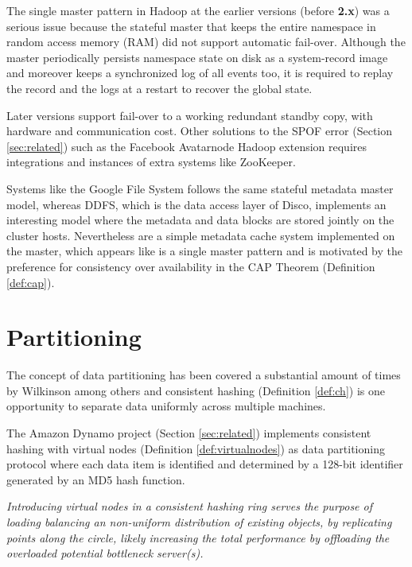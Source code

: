 The single master pattern in Hadoop at the earlier versions (before \textbf{2.x}) was a serious issue because the stateful master that keeps the entire namespace in random access memory (RAM) did not support automatic fail-over. Although the master periodically persists namespace state on disk as a system-record image and moreover keeps a synchronized log of all events too, it is required to replay the record and the logs at a restart to recover the global state.

Later versions support fail-over to a working redundant standby copy, with hardware and communication cost. Other solutions to the SPOF error (Section \ref{sec:related}) such as the Facebook Avatarnode Hadoop extension requires integrations and instances of extra systems like ZooKeeper.
\newline

Systems like the Google File System follows the same stateful metadata master model, whereas DDFS, which is the data access layer of Disco, implements an interesting model where the metadata and data blocks are stored jointly on the cluster hosts. Nevertheless are a simple metadata cache system implemented on the master, which appears like is a single master pattern and is motivated by the preference for consistency over availability in the CAP Theorem (Definition \ref{def:cap}).

\section{Partitioning} \label{sec:partitioning}
The concept of data partitioning has been covered a substantial amount of times by Wilkinson \etal \cite{Wilkinson:1998:PPT:289352} among others and consistent hashing (Definition \ref{def:ch}) is one opportunity to separate data uniformly across multiple machines.

The Amazon Dynamo project (Section \ref{sec:related}) implements consistent hashing with virtual nodes (Definition \ref{def:virtualnodes}) as data partitioning protocol where each data item is identified and determined by a 128-bit identifier generated by an MD5 hash function.
\vspace*{3mm}

\begin{definition} \label{def:virtualnodes}
\textit{Introducing virtual nodes in a consistent hashing ring serves the purpose of loading balancing an non-uniform distribution of existing objects, by replicating points along the circle, likely increasing the total performance by offloading the overloaded potential bottleneck server(s).}
\end{definition}
\vspace*{3mm}

